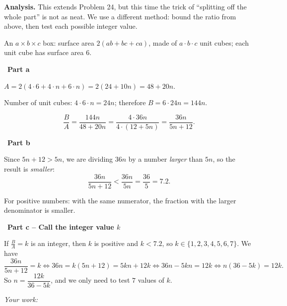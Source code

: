 \documentclass[11pt]{article}
\newif\ifsol \solfalse
\newcommand{\probsol}[1]{%
  \begin{lrbox}{\solmeasure}\begin{minipage}{\dimexpr\linewidth-24pt\relax}#1\end{minipage}\end{lrbox}%
  \ifsol
    \begin{solbox}#1\end{solbox}%
  \else
    \setlength{\solht}{\dimexpr\ht\solmeasure+\dp\solmeasure+0.85cm\relax}%
    \ifdim\solht<1.35cm\setlength{\solht}{1.35cm}\fi
    \ifdim\solht>\StudentMaxWork\setlength{\solht}{\StudentMaxWork}\fi
    \begin{tcolorbox}[colback=white,colframe=Line,boxrule=0.8pt,arc=5pt,
      left=8pt,right=8pt,top=4pt,bottom=4pt,height=\solht]{\footnotesize\color{Slate}\itshape\WorkWord}\end{tcolorbox}%
  \fi}
\newlength{\StudentMaxWork}\setlength{\StudentMaxWork}{7.5cm}
\newcommand{\step}[2]{\par\smallskip\noindent{\bfseries\color{tmBlue!85!black}\StepWord~#1.}\ {\bfseries #2}\par\nopagebreak}
\def\WorkWord{Your work:}
\def\StepWord{Step}
\begin{document}
\probsol{
\textbf{Analysis.} This extends Problem 24, but this time the trick of ``splitting off the whole part'' is not as neat. We use a different method: bound the ratio from above, then test each possible integer value.
\begin{recallbox}An $a\times b\times c$ box: surface area $2(ab+bc+ca)$, made of $a\cdot b\cdot c$ unit cubes; each unit cube has surface area $6$.\end{recallbox}

\step{1}{Part a}
$A=2(4\cdot 6+4\cdot n+6\cdot n)=2(24+10n)=48+20n$.\par
Number of unit cubes: $4\cdot 6\cdot n=24n$; therefore $B=6\cdot 24n=144n$.\par
\[ \frac{B}{A}=\frac{144n}{48+20n}=\frac{4\cdot 36n}{4\cdot(12+5n)}=\frac{36n}{5n+12}. \]

\step{2}{Part b}
Since $5n+12>5n$, we are dividing $36n$ by a number \emph{larger} than $5n$, so the result is \emph{smaller}:
\[ \frac{36n}{5n+12}<\frac{36n}{5n}=\frac{36}{5}=7.2. \]
\begin{recallbox}For positive numbers: with the same numerator, the fraction with the larger denominator is smaller.\end{recallbox}

\step{3}{Part c -- Call the integer value $k$}
If $\frac{B}{A}=k$ is an integer, then $k$ is positive and $k<7.2$, so $k\in\{1,2,3,4,5,6,7\}$. We have
\[ \frac{36n}{5n+12}=k \iff 36n=k(5n+12)=5kn+12k \iff 36n-5kn=12k \iff n(36-5k)=12k. \]
So $n=\dfrac{12k}{36-5k}$, and we only need to test $7$ values of $k$.

}
\end{document}
